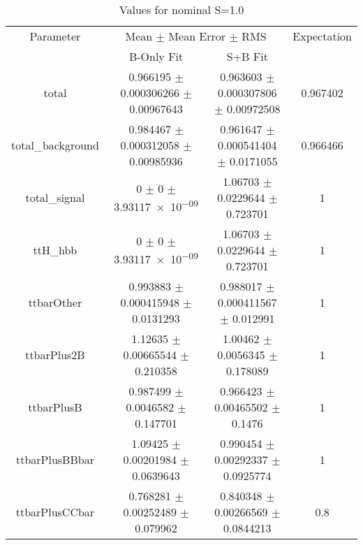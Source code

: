 \begin{table}
\centering
\caption{Values for nominal S=1.0}
\begin{tabular}{cccc}
\toprule
Parameter & \multicolumn{2}{c}{Mean $\pm$ Mean Error $\pm$ RMS} & Expectation\\
 & B-Only Fit & S+B Fit & \\
\midrule
total & \num{0.966195} $\pm$ \num{0.000306266} $\pm$ \num{0.00967643} & \num{0.963603} $\pm$ \num{0.000307806} $\pm$ \num{0.00972508} & \num{0.967402}\\
total\_background & \num{0.984467} $\pm$ \num{0.000312058} $\pm$ \num{0.00985936} & \num{0.961647} $\pm$ \num{0.000541404} $\pm$ \num{0.0171055} & \num{0.966466}\\
total\_signal & \num{0} $\pm$ \num{0} $\pm$ \num{3.93117e-09} & \num{1.06703} $\pm$ \num{0.0229644} $\pm$ \num{0.723701} & \num{1}\\
ttH\_hbb & \num{0} $\pm$ \num{0} $\pm$ \num{3.93117e-09} & \num{1.06703} $\pm$ \num{0.0229644} $\pm$ \num{0.723701} & \num{1}\\
ttbarOther & \num{0.993883} $\pm$ \num{0.000415948} $\pm$ \num{0.0131293} & \num{0.988017} $\pm$ \num{0.000411567} $\pm$ \num{0.012991} & \num{1}\\
ttbarPlus2B & \num{1.12635} $\pm$ \num{0.00665544} $\pm$ \num{0.210358} & \num{1.00462} $\pm$ \num{0.0056345} $\pm$ \num{0.178089} & \num{1}\\
ttbarPlusB & \num{0.987499} $\pm$ \num{0.0046582} $\pm$ \num{0.147701} & \num{0.966423} $\pm$ \num{0.00465502} $\pm$ \num{0.1476} & \num{1}\\
ttbarPlusBBbar & \num{1.09425} $\pm$ \num{0.00201984} $\pm$ \num{0.0639643} & \num{0.990454} $\pm$ \num{0.00292337} $\pm$ \num{0.0925774} & \num{1}\\
ttbarPlusCCbar & \num{0.768281} $\pm$ \num{0.00252489} $\pm$ \num{0.079962} & \num{0.840348} $\pm$ \num{0.00266569} $\pm$ \num{0.0844213} & \num{0.8}\\
\bottomrule
\end{tabular}
\end{table}